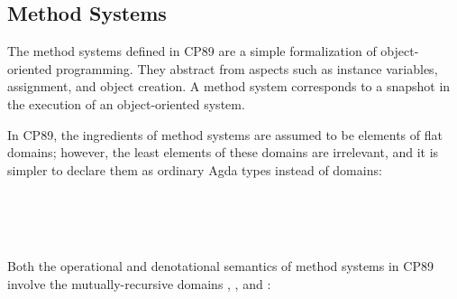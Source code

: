 \begin{AgdaAlign}
\subsection{Method Systems}

The method systems defined in CP89 are a simple formalization of object-oriented programming.
They abstract from aspects such as instance variables, assignment, and object creation.
A method system corresponds to a snapshot in the execution of an object-oriented system.

In CP89, the ingredients of method systems are assumed to be elements of flat domains;
however, the least elements of these domains are irrelevant,
and it is simpler to declare them as ordinary Agda types instead of domains:
%
\begin{code}%
%
\>[4]\AgdaSymbol{(}\AgdaSpace{}%
%
\>[17]\AgdaSymbol{:}\AgdaSpace{}%
\AgdaSpace{}%
\AgdaSymbol{)}%
\>[32]\<%
\\
%
\>[4]\AgdaSymbol{(}\AgdaSpace{}%
%
\>[17]\AgdaSymbol{:}\AgdaSpace{}%
\AgdaSpace{}%
\AgdaSymbol{)}%
\>[32]\<%
\\
%
\>[4]\AgdaSymbol{(}\AgdaSpace{}%
%
\>[17]\AgdaSymbol{:}\AgdaSpace{}%
\AgdaSpace{}%
\AgdaSymbol{)}%
\>[32]\<%
\\
%
\>[4]\AgdaSymbol{(}\AgdaSpace{}%
%
\>[17]\AgdaSymbol{:}\AgdaSpace{}%
\AgdaSpace{}%
\AgdaSymbol{)}%
\>[32]\<%
\end{code}
%
Both the operational and denotational semantics of method systems in CP89 involve
the mutually-recursive domains , , and :
%
\begin{code}%
%
\>[4]\AgdaSymbol{(}\AgdaSpace{}%
%
\>[16]\AgdaSymbol{:}\AgdaSpace{}%
\AgdaSpace{}%
\AgdaSymbol{)}%
\>[32]\<%
\\
%
\>[4]\AgdaSymbol{(}\AgdaSpace{}%
%
\>[16]\AgdaSymbol{:}\AgdaSpace{}%
\AgdaSpace{}%
\AgdaSymbol{)}%
\>[32]\<%
\\
%
\>[4]\AgdaSymbol{(}\AgdaSpace{}%
%
\>[16]\AgdaSymbol{:}\AgdaSpace{}%
\AgdaSpace{}%
\AgdaSymbol{)}%

\end{code}
\end{AgdaAlign}
